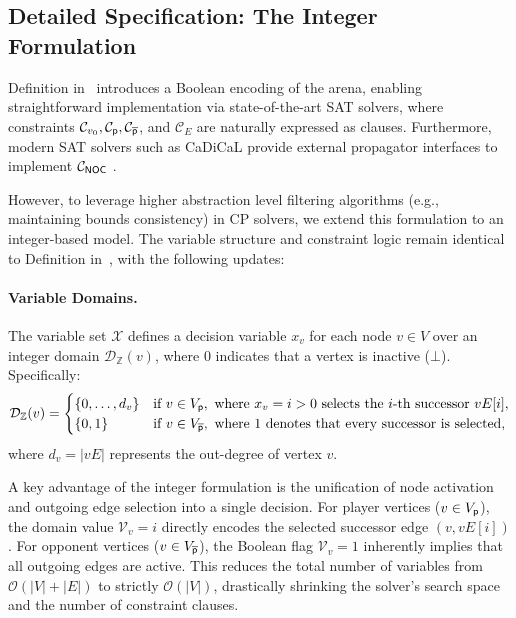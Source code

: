 \documentclass{article}
\begin{document}
\begin{appendices}

\section{Detailed Specification: The Integer Formulation}\label{apx:integer}

Definition in~\cite{Hernandez:2026:noc} introduces a Boolean encoding of the arena, enabling straightforward implementation via state-of-the-art SAT solvers, where constraints $\mathcal{C}_{v_0}, \mathcal{C}_{\mathsf{p}}, \mathcal{C}_{\overline{\mathsf{p}}}$, and $\mathcal{C}_{E}$ are naturally expressed as clauses. Furthermore, modern SAT solvers such as CaDiCaL provide external propagator interfaces to implement $\mathcal{C}_{{\textsf{NOC}}}$ \cite{Fazekas:2023}.

However, to leverage higher abstraction level filtering algorithms (e.g., maintaining bounds consistency) in CP solvers, we extend this formulation to an integer-based model. The variable structure and constraint logic remain identical to Definition in~\cite{Hernandez:2026:noc}, with the following updates:

\paragraph{Variable Domains.} The variable set $\mathcal{X}$ defines a decision variable $x_v$ for each node $v \in V$ over an integer domain $\mathcal{D}_{\mathbb{Z}}(v)$, where $0$ indicates that a vertex is inactive ($\bot$). Specifically:
\[
\mathcal{D}_{\mathbb{Z}}(v) = 
\begin{cases} 
    \{0, \dots, d_v\} & \text{if } v \in V_{\mathsf{p}}, \text{ where } x_v = i > 0 \text{ selects the } i\text{-th successor } vE[i], \\
    \{0, 1\} & \text{if } v \in V_{\overline{\mathsf{p}}}, \text{ where } 1 \text{ denotes that every successor is selected,}
\end{cases}
\]
where $d_v = |vE|$ represents the out-degree of vertex $v$.

A key advantage of the integer formulation is the unification of node activation and outgoing edge selection into a single decision. For player vertices ($v \in V_{\mathsf{p}}$), the domain value $\mathcal{V}_v = i$ directly encodes the selected successor edge $(v, vE[i])$. For opponent vertices ($v \in V_{\overline{\mathsf{p}}}$), the Boolean flag $\mathcal{V}_v = 1$ inherently implies that all outgoing edges are active. This reduces the total number of variables from $\mathcal{O}(|V| + |E|)$ to strictly $\mathcal{O}(|V|)$, drastically shrinking the solver's search space and the number of constraint clauses.


\end{appendices}
\end{document}
